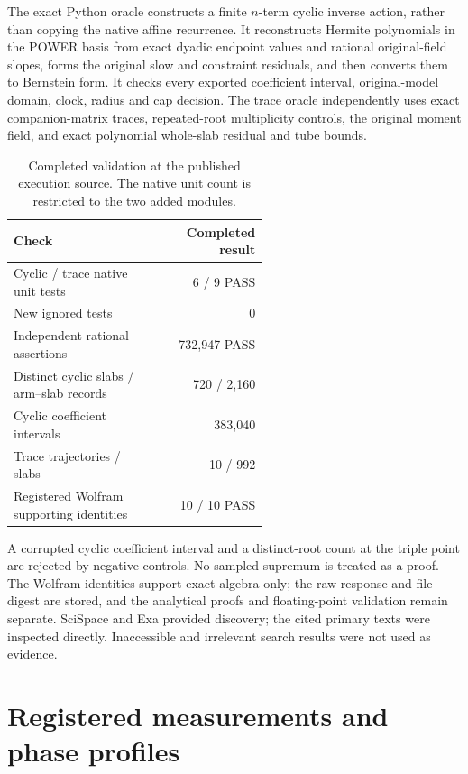 \documentclass[aps,pra,reprint,onecolumn,10pt,notitlepage,nofootinbib]{revtex4-2}
\begin{document}
The exact Python oracle constructs a finite $n$-term cyclic inverse action,
rather than copying the native affine recurrence. It reconstructs Hermite
polynomials in the POWER basis from exact dyadic endpoint values and rational
original-field slopes, forms the original slow and constraint residuals, and
then converts them to Bernstein form. It checks every exported coefficient
interval, original-model domain, clock, radius and cap decision. The trace
oracle independently uses exact companion-matrix traces, repeated-root
multiplicity controls, the original moment field, and exact polynomial
whole-slab residual and tube bounds.

\begin{table}[h]
\caption{Completed validation at the published execution source. The native
unit count is restricted to the two added modules.}
\begin{ruledtabular}
\begin{tabular}{L{0.56\linewidth}r}
Check & Completed result \\
\hline
Cyclic / trace native unit tests & 6 / 9 PASS \\
New ignored tests & 0 \\
Independent rational assertions & 732,947 PASS \\
Distinct cyclic slabs / arm--slab records & 720 / 2,160 \\
Cyclic coefficient intervals & 383,040 \\
Trace trajectories / slabs & 10 / 992 \\
Registered Wolfram supporting identities & 10 / 10 PASS
\end{tabular}
\end{ruledtabular}
\end{table}

A corrupted cyclic coefficient interval and a distinct-root count at the
triple point are rejected by negative controls. No sampled supremum is treated
as a proof. The Wolfram identities support exact algebra only; the raw response
and file digest are stored, and the analytical proofs and floating-point
validation remain separate. SciSpace and Exa provided discovery; the cited
primary texts were inspected directly. Inaccessible and irrelevant search
results were not used as evidence.

\section{Registered measurements and phase profiles}
\end{document}
